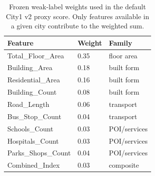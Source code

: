 \begin{table}[H]
\centering
\small
\caption{Frozen weak-label weights used in the default City1 v2 proxy score. Only features available in a given city contribute to the weighted sum.}
\label{tab:s4_weak_weights}
\begin{tabular}{lll}
\toprule
Feature & Weight & Family \\
\midrule
Total\_Floor\_Area & 0.35 & floor area \\
Building\_Area & 0.18 & built form \\
Residential\_Area & 0.16 & built form \\
Building\_Count & 0.08 & built form \\
Road\_Length & 0.06 & transport \\
Bus\_Stop\_Count & 0.04 & transport \\
Schools\_Count & 0.03 & POI/services \\
Hospitals\_Count & 0.03 & POI/services \\
Parks\_Shops\_Count & 0.04 & POI/services \\
Combined\_Index & 0.03 & composite \\
\bottomrule
\end{tabular}
\end{table}
